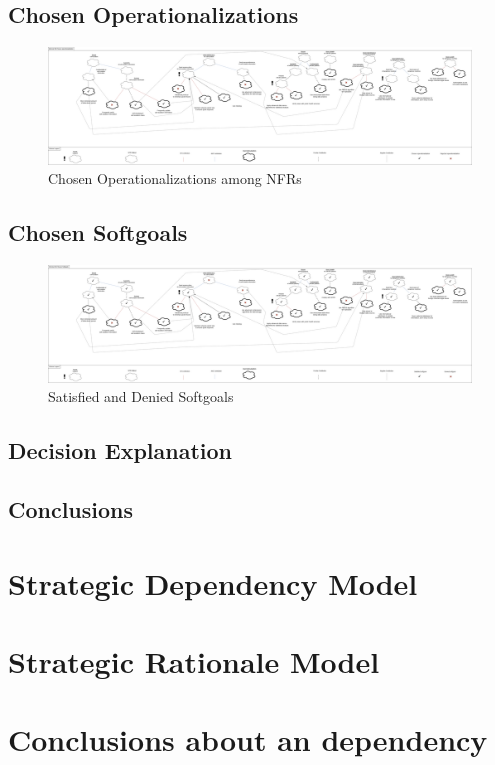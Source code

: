 \documentclass{VUMIFPSkursinis}
\begin{document}
\begin{landscape}
\subsection{Chosen Operationalizations}
	\begin{figure}[H]
		\center
		\includegraphics[scale=0.2]{img/Operationalization}
		\caption{Chosen Operationalizations among NFRs} %
		\label{img:kurimoProcesas}
	\end{figure}
	
	
\subsection{Chosen Softgoals}
	\begin{figure}[H]
		\center
		\includegraphics[scale=0.2]{img/Satisfied-Goals}
		\caption{Satisfied and Denied Softgoals} %
		\label{img:kurimoProcesas}
	\end{figure}
\end{landscape}
\subsection{Decision Explanation}
\subsection{Conclusions}
\section{Strategic Dependency Model}
\section{Strategic Rationale Model}
\section{Conclusions about an dependency}
	
\end{document}
